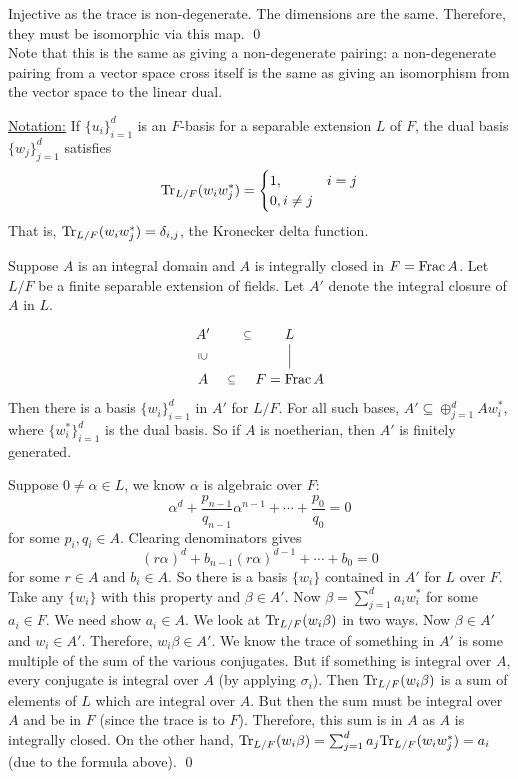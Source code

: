 \pf Injective as the trace is non-degenerate. The dimensions are the same. Therefore, they must be isomorphic via this map. \qed \\

Note that this is the same as giving a non-degenerate pairing: a non-degenerate pairing from a vector space cross itself is the same as giving an isomorphism from the vector space to the linear dual. 


\noindent \underline{Notation:} If $\{u_i\}_{i=1}^d$ is an $F$-basis for a separable extension $L$ of $F$, the dual basis $\{w_j \}_{j=1}^d$ satisfies 
	\[
	\text{Tr}_{L/F}(w_i w_j^*)=
	\begin{cases}
	1, & i=j \\
	0, i \neq j
	\end{cases}
	\]
That is, $\text{Tr}_{L/F}(w_iw_j^*)=\delta_{i,j}$, the Kronecker delta function. 

\begin{thm}
Suppose $A$ is an integral domain and $A$ is integrally closed in $F=\operatorname{Frac} A$. Let $L/F$ be a finite separable extension of fields. Let $A'$ denote the integral closure of $A$ in $L$. 
	\[
	\begin{tikzcd}
	 A' \arrow[draw=none]{d}[sloped,auto=false]{\supseteq} \arrow[draw=none]{r}[sloped,auto=false]{\subseteq} & L \arrow[dash]{d} \\
	A \arrow[draw=none]{r}[sloped,auto=false]{\subseteq} & F=\Frac A
	\end{tikzcd}
	\] 
Then there is a basis $\{w_i\}_{i=1}^d$ in $A'$ for $L/F$. For all such bases, $A' \subseteq \oplus_{j=1}^d A w_i^*$, where $\{w_i^*\}_{i=1}^d$ is the dual basis. So if $A$ is noetherian, then $A'$ is finitely generated. 
\end{thm}

\pf Suppose $0\neq \alpha \in L$, we know $\alpha$ is algebraic over $F$:
	\[
	\alpha^d + \frac{p_{n-1}}{q_{n-1}} \alpha^{n-1} + \cdots + \dfrac{p_0}{q_0}=0
	\]
for some $p_i,q_i \in A$. Clearing denominators gives
	\[
	(r\alpha)^d+ b_{n-1} (r\alpha)^{d-1} + \cdots + b_0=0
	\]
for some $r \in A$ and $b_i \in A$. So there is a basis $\{w_i\}$ contained in $A'$ for $L$ over $F$. Take any $\{w_i\}$ with this property and $\beta \in A'$. Now $\beta=\sum_{j=1}^d a_i w_i^*$ for some $a_i \in F$. We need show $a_i \in A$. We look at $\text{Tr}_{L/F}(w_i\beta)$ in two ways. Now $\beta \in A'$ and $w_i \in A'$. Therefore, $w_i \beta \in A'$. We know the trace of something in $A'$ is some multiple of the sum of the various conjugates. But if something is integral over $A$, every conjugate is integral over $A$ (by applying $\sigma_i$). Then $\text{Tr}_{L/F}(w_i\beta)$ is a sum of elements of $L$ which are integral over $A$. But then the sum must be integral over $A$ and be in $F$ (since the trace is to $F$). Therefore, this sum is in $A$ as $A$ is integrally closed. On the other hand, $\text{Tr}_{L/F}(w_i\beta)=\sum_{j=1}^d a_j \text{Tr}_{L/F}(w_iw_j^*)=a_i$ (due to the formula above). \qed \\



